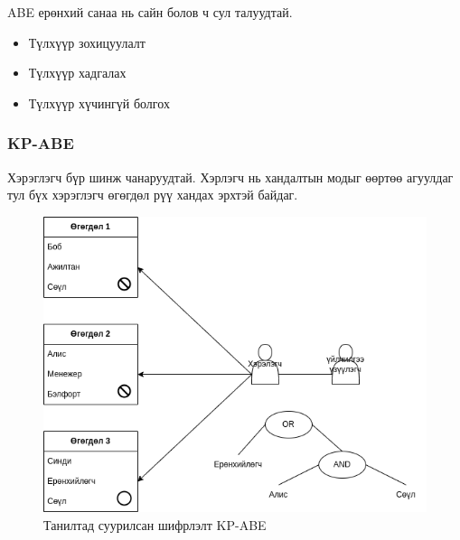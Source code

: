 ABE ерөнхий санаа нь сайн болов ч сул талуудтай.
\begin{itemize}
    \item Түлхүүр зохицуулалт
    \item Түлхүүр хадгалах
    \item Түлхүүр хүчингүй болгох
\end{itemize}

\subsubsection*{KP-ABE}
Хэрэглэгч бүр шинж чанаруудтай. Хэрлэгч нь хандалтын модыг өөртөө агуулдаг тул бүх хэрэглэгч өгөгдөл рүү хандах эрхтэй байдаг.
\begin{figure}[ht]
    \centering
    \includegraphics[scale=0.6]{Figures/encryption_schemes/kp-abe.drawio.png}
    \caption{Танилтад суурилсан шифрлэлт KP-ABE}
    \label{fig:kp-abe}
\end{figure}


